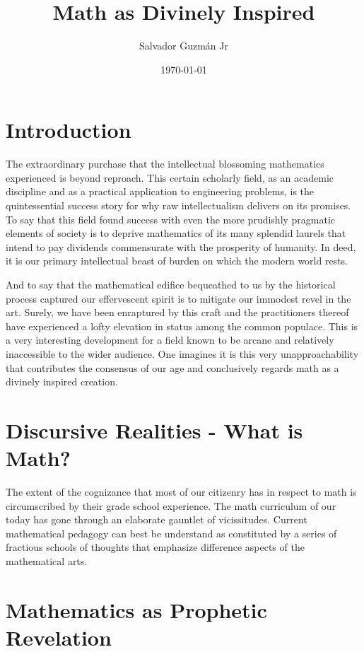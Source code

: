 \documentclass{article}
\begin{document}
	
	\title{Math as Divinely Inspired}
	\author{Salvador Guzm\'{a}n Jr}
	\date{\today}
	\maketitle
	\tableofcontents
	
	\section{Introduction}
	The extraordinary purchase that the intellectual blossoming mathematics experienced is beyond reproach. This certain scholarly field, as an academic discipline and as a practical application to engineering problems, is the quintessential success story for why raw intellectualism delivers on its promises. To say that this field found success with even the more prudishly pragmatic elements of society is to deprive mathematics of its many splendid laurels that intend to pay dividends commensurate with the prosperity of humanity. In deed, it is our primary intellectual beast of burden on which the modern world rests.
	
	And to say that the mathematical edifice bequeathed to us by the historical process captured our effervescent spirit is to mitigate our immodest revel in the art. Surely, we have been enraptured by this craft and the practitioners thereof have experienced a lofty elevation in status among the common populace. This is a very interesting development for a field known to be arcane and relatively inaccessible to the wider audience. One imagines it is this very unapproachability that contributes the consensus of our age and conclusively regards math as a divinely inspired creation.
	
	\section{Discursive Realities - What is Math?}
	The extent of the cognizance that most of our citizenry has in respect to math is circumscribed by their grade school experience. The math curriculum of our today has gone through an elaborate gauntlet of vicissitudes. Current mathematical pedagogy can best be understand as constituted by a series of fractious schools of thoughts that emphasize difference aspects of the mathematical arts.
	
	\section{Mathematics as Prophetic Revelation}
	
\end{document}
